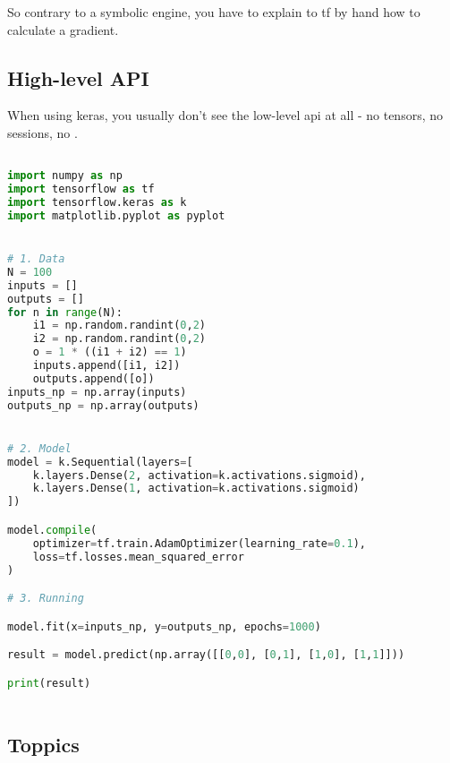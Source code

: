 So contrary to a symbolic engine, you have to explain to tf by hand how to calculate a gradient. 

\subsection{High-level API}

When using keras, you usually don't see the low-level api at all - no tensors, no sessions, no .

\begin{lstlisting}[language=python]

import numpy as np
import tensorflow as tf
import tensorflow.keras as k
import matplotlib.pyplot as pyplot


# 1. Data
N = 100
inputs = []
outputs = []
for n in range(N):
    i1 = np.random.randint(0,2)
    i2 = np.random.randint(0,2)
    o = 1 * ((i1 + i2) == 1)
    inputs.append([i1, i2])
    outputs.append([o])
inputs_np = np.array(inputs)
outputs_np = np.array(outputs)


# 2. Model
model = k.Sequential(layers=[
    k.layers.Dense(2, activation=k.activations.sigmoid),
    k.layers.Dense(1, activation=k.activations.sigmoid)
])

model.compile(
    optimizer=tf.train.AdamOptimizer(learning_rate=0.1),
    loss=tf.losses.mean_squared_error
)

# 3. Running

model.fit(x=inputs_np, y=outputs_np, epochs=1000)

result = model.predict(np.array([[0,0], [0,1], [1,0], [1,1]]))

print(result)



\end{lstlisting}


\subsection{Toppics}

